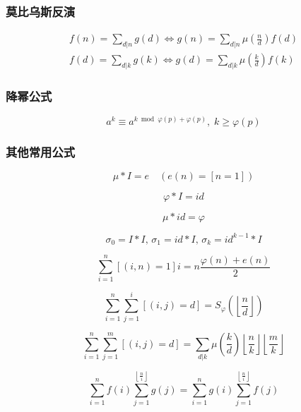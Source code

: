 \subsubsection{莫比乌斯反演}
	$$ \begin{aligned}
		f(n) = \sum_{d | n} g(d) \Leftrightarrow g(n) = \sum_{d | n} \mu\left( \frac n d \right) f(d) \\
		f(d) = \sum_{d | k} g(k) \Leftrightarrow g(d) = \sum_{d | k} \mu\left( \frac k d \right) f(k)
	\end{aligned} $$

\subsubsection{降幂公式}

$$ a^k \equiv a ^ {k \bmod \varphi(p) + \varphi(p)},\; k \ge \varphi(p) $$

\subsubsection{其他常用公式}
	$$\mu * I = e \quad (e(n) = [n = 1])$$

	$$\varphi * I = id $$

	$$\mu * id = \varphi $$

	$$\sigma_0 = I * I ,\, \sigma_1 = id * I ,\, \sigma_k = id^{k - 1} * I$$

	$$\sum_{i = 1} ^ n \left[(i, n) = 1\right] i = n \frac {\varphi(n) + e(n)} 2$$
	
	$$\sum_{i = 1} ^ n \sum_{j = 1} ^ i \left[(i, j) = d\right] = S_\varphi \left( \left\lfloor \frac n d \right\rfloor \right)$$

	$$\sum_{i = 1} ^ n \sum_{j = 1} ^ m \left[(i, j) = d\right] = \sum_{d | k} \mu\left( \frac k d \right) \left\lfloor \frac n k \right\rfloor \left\lfloor \frac m k \right\rfloor$$

	$$ \sum_{i = 1} ^ n f(i) \sum_{j = 1} ^ {\left\lfloor \frac n i \right\rfloor} g(j) = \sum_{i = 1} ^ n g(i) \sum_{j = 1} ^ {\left\lfloor \frac n i \right\rfloor} f(j) $$